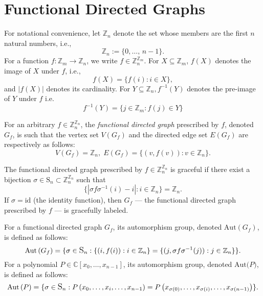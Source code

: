 \section{Functional Directed Graphs}\label{sec:Functional Directed Graphs}
For notational convenience, let $\mathbb{Z}_{n}$ denote the set whose members are the first $n$ natural numbers, i.e.,
\begin{equation}
\mathbb{Z}_{n}:=\big\{0,\ldots,\,n-1\big\}.
\end{equation}
For a function $f:\mathbb{Z}_{m}\to\mathbb{Z}_{n}$, we write $f\in\mathbb{Z}_{n}^{\mathbb{Z}_{m}}$.
For $X\subseteq\mathbb{Z}_{m}$, $f(X)$ denotes the image of $X$
under $f$, i.e.,
\begin{equation}
f(X)=\{f(i):i\in X\},
\end{equation}
and $|f(X)|$ denotes its
cardinality. For $Y\subseteq\mathbb{Z}_{n}\ensuremath{,}f^{-1}(Y)$
denotes the pre-image of $Y$ under $f$ i.e.
\begin{equation}
f^{-1}(Y)=\{j\in\mathbb{Z}_{m}:f(j)\in Y\}
\end{equation}
\begin{definition}\label{defn:functional-directed-graphs}
For an arbitrary $f\in \mathbb{Z}_n^{\mathbb{Z}_n}$, the \emph{functional directed graph} prescribed by $f$, denoted $G_f$, is such that the vertex set $V(G_f)$ and the directed edge set $E(G_f)$ are respectively as follows:
\[
V(G_f) = \mathbb{Z}_n, \; E(G_f) = \{(v,f(v)):v \in \mathbb{Z}_n\}.
\]
\end{definition}
\begin{definition}\label{defn:graceful-functional-graphs}
The functional directed graph prescribed by $f\in\mathbb{Z}_{n}^{\mathbb{Z}_{n}}$ is graceful if there exist
a bijection $\sigma\in \text{S}_n \subset
 \mathbb{Z}_{n}^{\mathbb{Z}_{n}}$ such that
\begin{equation}
\big\{\left|\sigma f\sigma^{-1}(i)-i\right|:i\in\mathbb{Z}_{n}\big\}=\mathbb{Z}_{n}.
\end{equation}
If $\sigma=\text{id}$ (the identity function), then $G_{f}$ --- the functional directed graph prescribed by $f$ --- is gracefully labeled. 
\end{definition}
\begin{defn}\label{defn:aut-functional-graphs}
For a functional directed graph $G_f$, its automorphism group, denoted $\text{Aut}\left(G_f\right)$, is defined as follows:
\[
\text{Aut}\left(G_f\right) = \large\{\sigma \in \text{S}_n : \{(i, f(i)): i \in \mathbb{Z}_n \} = \{(j, \sigma f \sigma^{-1} (j)) : j \in \mathbb{Z}_n\}\large\}. 
\]
For a polynomial $P \in \mathbb{C}[x_0, \ldots, x_{n-1}]$, its automorphism group, denoted $\text{Aut($P$)}$, is defined as follows:
\[
\text{Aut}\left(P\right)=\large\{\sigma\in\text{S}_{n}:P\left(x_{0},\ldots,x_{i},\ldots,x_{n-1}\right)=P\left(x_{\sigma(0)},\ldots,x_{\sigma(i)},\ldots,x_{\sigma(n-1)}\right)\large\}.
\]
\end{defn}
